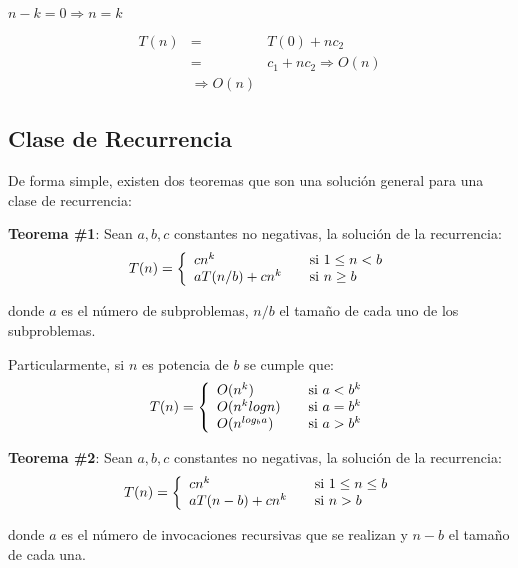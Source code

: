 $n - k = 0 \Rightarrow n = k$

\begin{eqnarray*}
T(n)&=&T(0) + nc_2\\
&=&c_1 + nc_2 \Rightarrow O(n) \\
&\Rightarrow O(n)
\end{eqnarray*}

\subsection{Clase de Recurrencia}

De forma simple, existen dos teoremas que son una solución general para una clase de recurrencia:

\textbf{Teorema \#1}: Sean $a, b, c$ constantes no negativas, la solución de la recurrencia:
\begin{equation}
T(n) = \left\{
  \begin{array}{l l}
    cn^{k} & \quad \text{si $1 \le n < b$}\\
    aT(n/b) + cn^{k}& \quad \text{si $n \ge b$}
  \end{array} \right.
 \end{equation}
 
\noindent donde $a$ es el número de subproblemas, $n/b$ el tamaño de cada uno de los subproblemas.

Particularmente, si $n$ es potencia de $b$ se cumple que:
\begin{equation}
T(n) = \left\{
  \begin{array}{l l}
    O(n^{k}) & \quad \text{si $a < b^{k}$}\\
    O(n^{k}logn) & \quad \text{si $a = b^{k}$}\\
    O(n^{log_b a}) & \quad \text{si $a > b^{k}$}
  \end{array} \right.
\end{equation}

\textbf{Teorema \#2}: Sean $a, b, c$ constantes no negativas, la solución de la recurrencia:
\begin{equation}
T(n) = \left\{
  \begin{array}{l l}
    cn^{k} & \quad \text{si $1 \le n \le b$}\\
    aT(n-b) + cn^{k}& \quad \text{si $n > b$}
  \end{array} \right.
 \end{equation}
 
\noindent donde $a$ es el número de invocaciones recursivas que se realizan y $n-b$ el tamaño de cada una.

